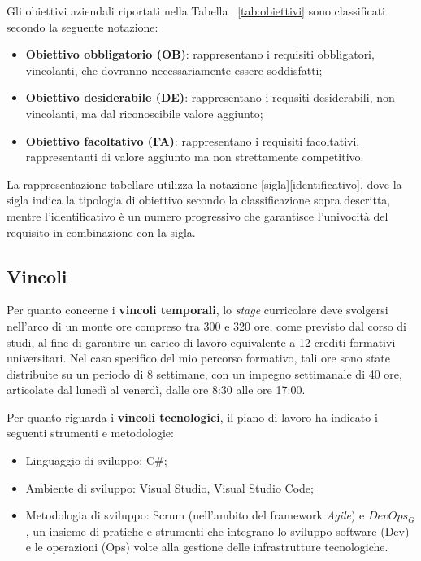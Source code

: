         Gli obiettivi aziendali riportati nella Tabella ~\ref{tab:obiettivi} sono classificati secondo la seguente notazione:
        \begin{itemize}
            \item \textbf{Obiettivo obbligatorio (OB)}: rappresentano i requisiti obbligatori, vincolanti, che dovranno necessariamente essere soddisfatti;
            \item \textbf{Obiettivo desiderabile (DE)}: rappresentano i requsiti desiderabili, non vincolanti, ma dal riconoscibile valore aggiunto;
            \item \textbf{Obiettivo facoltativo (FA)}: rappresentano i requisiti facoltativi, rappresentanti di valore aggiunto ma non strettamente competitivo.
        \end{itemize}
        La rappresentazione tabellare utilizza la notazione [sigla][identificativo], dove la sigla indica la tipologia di obiettivo secondo la classificazione sopra descritta, mentre l’identificativo è un numero progressivo che garantisce l’univocità del requisito in combinazione con la sigla. 

        \subsection{Vincoli}
        
        Per quanto concerne i \textbf{vincoli temporali}, lo \textit{stage} curricolare deve svolgersi nell’arco di un monte ore compreso tra 300 e 320 ore, come previsto dal corso di studi, al fine di garantire un carico di lavoro equivalente a 12 crediti formativi universitari. Nel caso specifico del mio percorso formativo, tali ore sono state distribuite su un periodo di 8 settimane, con un impegno settimanale di 40 ore, articolate dal lunedì al venerdì, dalle ore 8:30 alle ore 17:00.   

        Per quanto riguarda i \textbf{vincoli tecnologici}, il piano di lavoro ha indicato i seguenti strumenti e metodologie:  
        \begin{itemize}
            \item Linguaggio di sviluppo: C\#;
            \item Ambiente di sviluppo: Visual Studio, Visual Studio Code;  
            \item Metodologia di sviluppo: Scrum (nell’ambito del framework \textit{Agile}) e $DevOps_G$, un insieme di pratiche e strumenti che integrano lo sviluppo software (Dev) e le operazioni (Ops) volte alla gestione delle infrastrutture tecnologiche. 
        \end{itemize}


